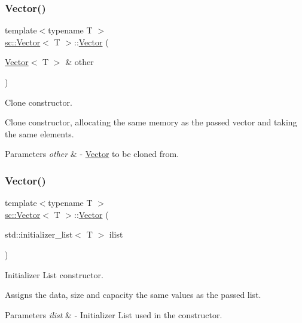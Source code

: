 \subsubsection{\texorpdfstring{Vector()}{Vector()}\hspace{0.1cm}{\footnotesize\ttfamily [2/3]}}
{\footnotesize\ttfamily template$<$typename T $>$ \\
\hyperlink{classsc_1_1Vector}{sc\+::\+Vector}$<$ T $>$\+::\hyperlink{classsc_1_1Vector}{Vector} (\begin{DoxyParamCaption}\item[{\hyperlink{classsc_1_1Vector}{Vector}$<$ T $>$ \&}]{other }\end{DoxyParamCaption})\hspace{0.3cm}{\ttfamily [inline]}}



Clone constructor. 

Clone constructor, allocating the same memory as the passed vector and taking the same elements. 
\begin{DoxyParams}{Parameters}
{\em other} & -\/ \hyperlink{classsc_1_1Vector}{Vector} to be cloned from. \\
\hline
\end{DoxyParams}
\mbox{\label{classsc_1_1Vector_aa2f49c9f44fcea07c3b9ce2f7867f2fb}} 
\subsubsection{\texorpdfstring{Vector()}{Vector()}\hspace{0.1cm}{\footnotesize\ttfamily [3/3]}}
{\footnotesize\ttfamily template$<$typename T $>$ \\
\hyperlink{classsc_1_1Vector}{sc\+::\+Vector}$<$ T $>$\+::\hyperlink{classsc_1_1Vector}{Vector} (\begin{DoxyParamCaption}\item[{std\+::initializer\+\_\+list$<$ T $>$}]{ilist }\end{DoxyParamCaption})\hspace{0.3cm}{\ttfamily [inline]}}



Initializer List constructor. 

Assigns the data, size and capacity the same values as the passed list. 
\begin{DoxyParams}{Parameters}
{\em ilist} & -\/ Initializer List used in the constructor. \\
\hline
\end{DoxyParams}


